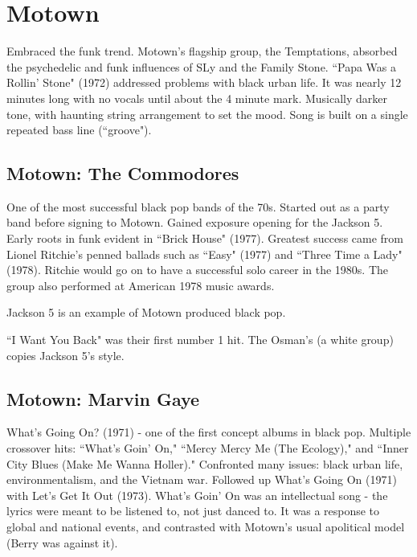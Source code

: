 \documentclass[12pt, a4paper, twoside, openright, titlepage]{book}
\begin{document}
\section{Motown}

Embraced the funk trend. Motown's flagship group, the Temptations, absorbed the psychedelic and funk influences of SLy and the Family Stone. ``Papa Was a Rollin' Stone" (1972) addressed problems with black urban life. It was nearly 12 minutes long with no vocals until about the 4 minute mark. Musically darker tone, with haunting string arrangement to set the mood. Song is built on a single repeated bass line (``groove").

\subsection{Motown: The Commodores}

One of the most successful black pop bands of the 70s. Started out as a party band before signing to Motown. Gained exposure opening for the Jackson 5. Early roots in funk evident in ``Brick House" (1977). Greatest success came from Lionel Ritchie's penned ballads such as ``Easy" (1977) and ``Three Time a Lady" (1978). Ritchie would go on to have a successful solo career in the 1980s. The group also performed at American 1978 music awards. 

\begin{rmk}{}{}
    Jackson 5 is an example of Motown produced black pop.
\end{rmk}

``I Want You Back" was their first number 1 hit. The Osman's (a white group) copies Jackson 5's style.

\subsection{Motown: Marvin Gaye}

What's Going On? (1971) - one of the first concept albums in black pop. Multiple crossover hits: ``What's Goin' On," ``Mercy Mercy Me (The Ecology)," and ``Inner City Blues (Make Me Wanna Holler)." Confronted many issues: black urban life, environmentalism, and the Vietnam war. Followed up What's Going On (1971) with Let's Get It Out (1973). What's Goin' On was an intellectual song - the lyrics were meant to be listened to, not just danced to. It was a response to global and national events, and contrasted with Motown's usual apolitical model (Berry was against it).
\end{document}
